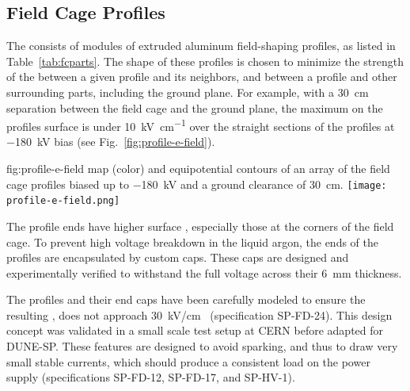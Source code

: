 \subsection{Field Cage Profiles}
\label{sec:fdsp-hv-des-fc-profiles}

The  consists of modules of extruded aluminum  field-shaping  %
profiles, as listed in Table~\ref{tab:fcparts}. The shape of these %
profiles is chosen to minimize the strength of the \efield{} between a given profile and its neighbors, and between a profile and
other surrounding parts, including the ground plane. For example, with a \SI{30}{\cm} separation between the field cage and the ground plane, the maximum \efield{} on the profiles surface is under \SI{10}{\kilo\volt\per\centi\meter} over the straight sections of the profiles at \SI{-180}{\kV} bias (see Fig.~\ref{fig:profile-e-field}).  


\begin{dunefigure}
{fig:profile-e-field}
{\efield{} map (color) and equipotential contours of an array of the field cage profiles biased up to \SI{-180}{\kV} and a ground clearance of \SI{30}{\cm}.} %
\texttt{[image: profile-e-field.png]}
\end{dunefigure}

The profile ends have higher surface \efield{}, especially those at the corners of the field cage. To prevent high voltage breakdown in the liquid argon, the ends of the profiles are encapsulated by custom  caps.  These caps are designed and experimentally verified to withstand the full voltage across their \SI{6}{\milli\m} thickness. 

The profiles and their end caps have been carefully modeled to ensure the resulting \efield{}, 
 does not approach \SI{30}{\kV}/{cm}~\cite{Blatter:2014wua} (specification SP-FD-24). This design concept was validated in a small scale test setup at CERN before adapted for DUNE-SP.
These features are designed to avoid sparking, and thus to draw very small stable currents, 
which should produce a consistent load on the power supply (specifications SP-FD-12, SP-FD-17, and SP-HV-1).

